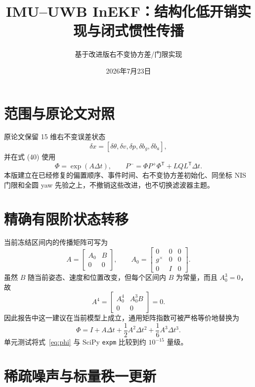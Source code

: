 \documentclass[11pt,a4paper]{ctexart}
\title{IMU--UWB InEKF：结构化低开销实现与闭式惯性传播}
\author{基于改进版右不变协方差/门限实现}
\date{2026年7月23日}
\begin{document}
\maketitle

\section{范围与原论文对照}

原论文保留 15 维右不变误差状态
\begin{equation}
 \delta x=[\delta\theta,\delta v,\delta p,\delta b_g,\delta b_a],
\end{equation}
并在式 (40) 使用
\begin{equation}
 \Phi=\exp(A\Delta t),\qquad
 P^-=\Phi P^+\Phi^{\mathsf T}+LQL^{\mathsf T}\Delta t.
\end{equation}
本版建立在已经修复的偏置顺序、事件时间、右不变协方差初始化、同坐标 NIS
门限和全圆 yaw 先验之上，不撤销这些改进，也不切换滤波器主题。

\section{精确有限阶状态转移}

当前冻结区间内的传播矩阵可写为
\begin{equation}
 A=\begin{bmatrix}A_0&B\\0&0\end{bmatrix},\qquad
 A_0=\begin{bmatrix}
 0&0&0\\g^\times&0&0\\0&I&0
 \end{bmatrix}.
\end{equation}
虽然 $B$ 随当前姿态、速度和位置改变，但每个区间内 $B$ 为常量，而且
$A_0^3=0$，故
\begin{equation}
 A^4=\begin{bmatrix}A_0^4&A_0^3B\\0&0\end{bmatrix}=0.
\end{equation}
因此报告中这一建议在当前模型上成立，通用矩阵指数可被严格等价地替换为
\begin{equation}
 \boxed{\Phi=I+A\Delta t+\frac12A^2\Delta t^2+
 \frac16A^3\Delta t^3.}
 \label{eq:phi}
\end{equation}
单元测试将式~\eqref{eq:phi} 与 SciPy \texttt{expm} 比较到约
$10^{-15}$ 量级。

\section{稀疏噪声与标量秩一更新}
\end{document}
